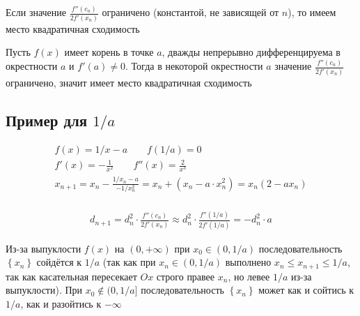 Если значение $\frac{f''(c_n)}{2f'(x_n)}$ ограничено (константой, не зависящей от $n$), то имеем место квадратичная сходимость

Пусть $f(x)$ имеет корень в точке $a$, дважды непрерывно дифференцируема в окрестности $a$ и $f'(a) \neq 0$.
Тогда в некоторой окрестности $a$ значение $\frac{f''(c_n)}{2f'(x_n)}$ ограничено, значит имеет место квадратичная сходимость

\subsection{Пример для $1/a$}

\begin{gather}
    f(x) = 1/x - a \qquad f(1/a) = 0 \\
    f'(x) = -\frac{1}{x^2} \qquad f''(x) = \frac{2}{x^3} \\
    x_{n + 1} = x_n - \frac{1/x_n - a}{-1/x_n^2} = x_n + \left(x_n - a \cdot x_n^2\right) = x_n (2 - ax_n) \\
\end{gather}


\begin{gather}
    d_{n + 1} = d_n^2 \cdot \frac{f''(c_n)}{2f'(x_n)} \approx d_n^2 \cdot \frac{f''(1/a)}{2f'(1/a)} = -d_n^2 \cdot a
\end{gather}


\begin{center}
\end{center}

Из-за выпуклости $f(x)$ на $(0, +\infty)$ при $x_0 \in (0, 1/a)$ последовательность $\left\{x_n\right\}$ сойдётся к $1/a$
(так как при $x_n \in (0, 1/a)$ выполнено $x_n \le x_{n + 1} \le 1/a$, так как касательная пересекает $Ox$ строго правее $x_n$, но левее $1/a$ из-за выпуклости).
При $x_0 \notin (0, 1/a]$ последовательность $\left\{x_n\right\}$ может как и сойтись к $1/a$, как и разойтись к $-\infty$

